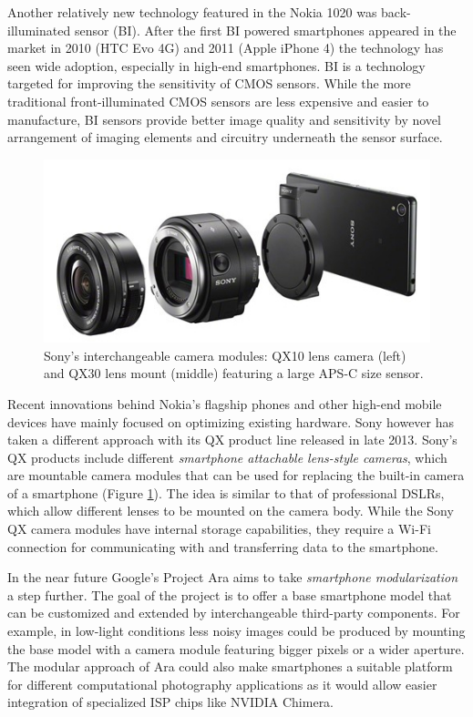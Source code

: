 \documentclass[thesis.tex]{subfiles}
\begin{document}
Another relatively new technology featured in the Nokia 1020 was back-illuminated sensor (BI). After the first BI powered smartphones appeared in the market in 2010 (HTC Evo 4G) and 2011 (Apple iPhone 4) the technology has seen wide adoption, especially in high-end smartphones. BI is a technology targeted for improving the sensitivity of CMOS sensors. While the more traditional front-illuminated CMOS sensors are less expensive and easier to manufacture, BI sensors provide better image quality and sensitivity by novel arrangement of imaging elements and circuitry underneath the sensor surface.

\begin{figure}[h]
\centering \includegraphics[width=\textwidth]{images/sony_qx.jpg}
\caption{Sony's interchangeable camera modules: QX10 lens camera (left) and QX30 lens mount (middle) featuring a large APS-C size sensor.\label{figure:sony-qx}}
\end{figure}

Recent innovations behind Nokia's flagship phones and other high-end mobile devices have mainly focused on optimizing existing hardware. Sony however has taken a different approach with its QX product line released in late 2013. Sony's QX products include different \textit{smartphone attachable lens-style cameras}, which are mountable camera modules that can be used for replacing the built-in camera of a smartphone (Figure \ref{figure:sony-qx}). The idea is similar to that of professional DSLRs, which allow different lenses to be mounted on the camera body. While the Sony QX camera modules have internal storage capabilities, they require a Wi-Fi connection for communicating with and transferring data to the smartphone.

In the near future Google's Project Ara aims to take \textit{smartphone modularization} a step further. The goal of the project is to offer a base smartphone model that can be customized and extended by interchangeable third-party components. For example, in low-light conditions less noisy images could be produced by mounting the base model with a camera module featuring bigger pixels or a wider aperture. The modular approach of Ara could also make smartphones a suitable platform for different computational photography applications as it would allow easier integration of specialized ISP chips like NVIDIA Chimera\texttrademark.
\end{document}
